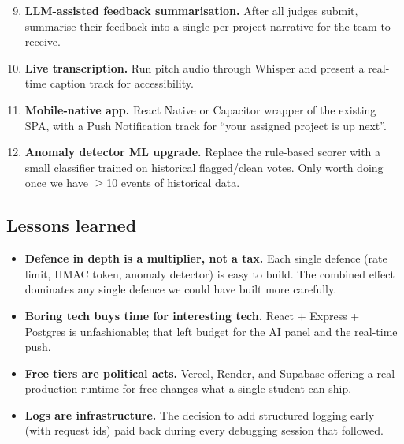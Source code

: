 \begin{enumerate}[leftmargin=*]
  \setcounter{enumi}{8}
  \item \textbf{LLM-assisted feedback summarisation.} After all judges
        submit, summarise their feedback into a single per-project
        narrative for the team to receive.
  \item \textbf{Live transcription.} Run pitch audio through Whisper
        and present a real-time caption track for accessibility.
  \item \textbf{Mobile-native app.} React Native or Capacitor wrapper
        of the existing SPA, with a Push Notification track for
        ``your assigned project is up next''.
  \item \textbf{Anomaly detector ML upgrade.} Replace the rule-based
        scorer with a small classifier trained on historical
        flagged/clean votes. Only worth doing once we have $\geq$10
        events of historical data.
\end{enumerate}

\subsection{Lessons learned}

\begin{itemize}[leftmargin=*]
  \item \textbf{Defence in depth is a multiplier, not a tax.} Each
        single defence (rate limit, HMAC token, anomaly detector) is
        easy to build. The combined effect dominates any single defence
        we could have built more carefully.
  \item \textbf{Boring tech buys time for interesting tech.} React +
        Express + Postgres is unfashionable; that left budget for the
        AI panel and the real-time push.
  \item \textbf{Free tiers are political acts.} Vercel, Render, and
        Supabase offering a real production runtime for free changes
        what a single student can ship.
  \item \textbf{Logs are infrastructure.} The decision to add structured
        logging early (with request ids) paid back during every
        debugging session that followed.
\end{itemize}
